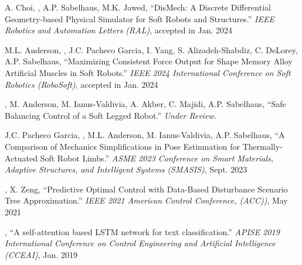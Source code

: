 { %
\begin{etaremune}[itemsep=0.0cm]
\item A. Choi, \myname, A.P. Sabelhaus, M.K. Jawed, ``DisMech: A Discrete Differential Geometry-based Physical Simulator for Soft Robots and Structures.'' {\it IEEE Robotics and Automation Letters (RAL)}, accepted in Jan. 2024  %
\item M.L. Anderson, \myname, J.C. Pacheco Garcia, I. Yang, S. Alizadeh-Shabdiz, C. DeLorey, A.P. Sabelhaus, ``Maximizing Consistent Force Output for Shape Memory Alloy Artificial Muscles in Soft Robots.'' {\it IEEE 2024 International Conference on Soft Robotics (RoboSoft)}, accepted in Jan. 2024 
\item \myname, M. Anderson, M. Ianus-Valdivia, A. Akber, C. Majidi, A.P. Sabelhaus, ``Safe Balancing Control of a Soft Legged Robot.'' {\it Under Review}. 
\item J.C. Pacheco Garcia, \myname, M.L. Anderson, M. Ianus-Valdivia, A.P. Sabelhaus, ``A Comparison of Mechanics Simplifications in Pose Estinmation for Thermally-Actuated Soft Robot Limbs.'' {\it ASME 2023 Conference on Smart Materials, Adaptive Structures, and Intelligent Systems (SMASIS)}, Sept. 2023 
\item \myname, X. Zeng, ``Predictive Optimal Control with Data-Based Disturbance Scenario Tree Approximation.'' {\it IEEE 2021 American Control Conference, (ACC))}, May 2021 
\item \myname, ``A self-attention based LSTM network for text classification.'' {\it APISE 2019 International Conference on Control Engineering and Artificial Intelligence (CCEAI)}, Jan. 2019 
\end{etaremune}
}





